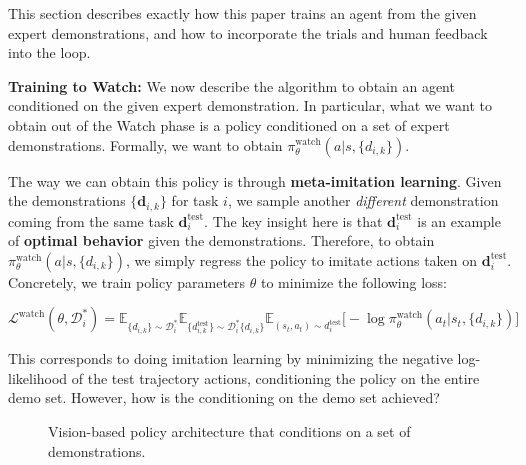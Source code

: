 \documentclass[
  letterpaper,
  numbers=noenddot,
  DIV=11]{scrreprt}
\theoremstyle{definition}
\theoremstyle{plain}
\theoremstyle{plain}
\theoremstyle{remark}
\begin{document}
This section describes exactly how this paper trains an agent from the
given expert demonstrations, and how to incorporate the trials and human
feedback into the loop.

\textbf{Training to Watch:} We now describe the algorithm to obtain an
agent conditioned on the given expert demonstration. In particular, what
we want to obtain out of the Watch phase is a policy conditioned on a
set of expert demonstrations. Formally, we want to obtain
\(\pi_\theta^{\text{watch}}(a | s, \{d_{i,k}\})\).

The way we can obtain this policy is through \textbf{meta-imitation
learning}. Given the demonstrations \(\{\textbf{d}_{i,k}\}\) for task
\(i\), we sample another \emph{different} demonstration coming from the
same task \(\textbf{d}_i^{\text{test}}\). The key insight here is that
\(\textbf{d}_i^{\text{test}}\) is an example of \textbf{optimal
behavior} given the demonstrations. Therefore, to obtain
\(\pi_\theta^{\text{watch}}(a | s, \{d_{i,k}\})\), we simply regress the
policy to imitate actions taken on \(\textbf{d}_i^{\text{test}}\).
Concretely, we train policy parameters \(\theta\) to minimize the
following loss:

\(\mathcal{L}^\text{watch}(\theta, \mathcal{D}_i^*) = \mathbb{E}_{\{d_{i,k}\} \sim \mathcal{D}_i^*} \mathbb{E}_{\{d_{i,k}^{\text{test}}\} \sim \mathcal{D}_i^*  \{d_{i,k}\}} \mathbb{E}_{(s_t, a_t) \sim d_i^{\text{test}}} \big[
- \log \pi_\theta^{\text{watch}} (a_t | s_t, \{d_{i,k}\}) \big]\)

This corresponds to doing imitation learning by minimizing the negative
log-likelihood of the test trajectory actions, conditioning the policy
on the entire demo set. However, how is the conditioning on the demo set
achieved?

\begin{figure}


\caption{\label{fig-watch-try-learn-arch}Vision-based policy
architecture that conditions on a set of demonstrations.}

\end{figure}%
\end{document}
